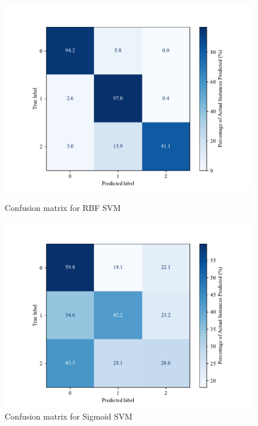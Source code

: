         \begin{figure}[H]
        \centering
        \begin{minipage}[b]{0.45\textwidth}
          \centering
          \includegraphics[width=\textwidth]{images/confusion_matrix_rbf.pdf}
          \caption{Confusion matrix for RBF SVM}
          \label{fig:confusion_rbf}
        \end{minipage}
        \hfill
        \begin{minipage}[b]{0.45\textwidth}
          \centering
          \includegraphics[width=\textwidth]{images/confusion_matrix_sigmoid_svm.pdf}
          \caption{Confusion matrix for Sigmoid SVM}
          \label{fig:confusion_sigmoid}
        \end{minipage}
        \end{figure}
        
